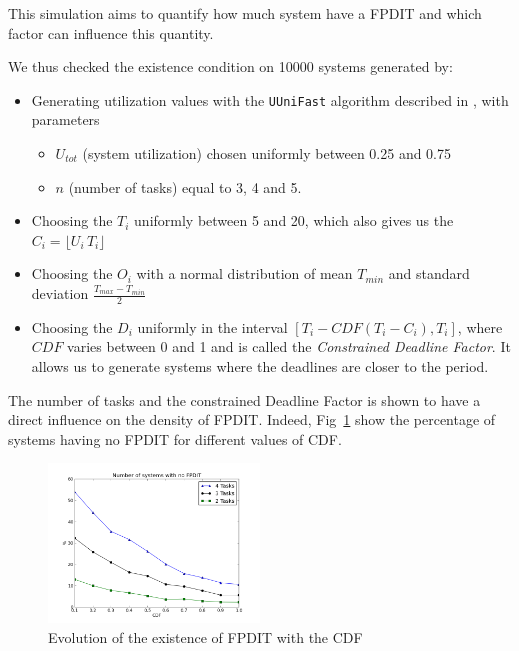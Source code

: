 \documentclass[conference]{IEEEtran}
\begin{document}
	This simulation aims to quantify how much system have a FPDIT and which factor can influence this quantity.

	We thus checked the existence condition on 10000 systems generated by:
	\begin{itemize}
		\item Generating utilization values with the \texttt{UUniFast} algorithm described in \cite{bini2005measuring}, with parameters
		\begin{itemize}
			\item $U_{tot}$ (system utilization) chosen uniformly between 0.25 and 0.75
			\item $n$ (number of tasks) equal to 3, 4 and 5.
		\end{itemize}
		\item Choosing the $T_i$ uniformly between 5 and 20, which also gives us the $C_i = \lfloor U_i \, T_i \rfloor$
		\item Choosing the $O_i$ with a normal distribution of mean $T_{min}$ and standard deviation $\frac{T_{max} - T_{min}}{2}$
		\item Choosing the $D_i$ uniformly in the interval $[T_i - CDF(T_i - C_i), T_i]$, where $CDF$ varies between 0 and 1 and is called the \emph{Constrained Deadline Factor}. It allows us to generate systems where the deadlines are closer to the period.
	\end{itemize}

	The number of tasks and the constrained Deadline Factor is shown to have a direct influence on the density of FPDIT. Indeed, Fig~\ref{fig:noFPDIT} show the percentage of systems having no FPDIT for different values of CDF.

	\begin{figure}[h]
	\begin{center}
		\includegraphics[width=0.5\textwidth]{figs/nofpdit_3.png}
	\end{center}
	\caption{Evolution of the existence of FPDIT with the CDF}
	\label{fig:noFPDIT}
	\end{figure}
\end{document}
